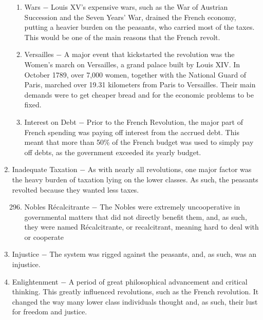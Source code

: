 \documentclass[12pt]{article}
\begin{document}
\begin{enumerate}
\begin{enumerate}[label=\arabic{*}.]
\item Wars $-$ Louis XV's expensive wars, such as the War of Austrian Succession and the Seven Years' War, drained the French economy, putting a heavier burden on the peasants, who carried most of the taxes. This would be one of the main reasons that the French revolt.

\item Versailles $-$ A major event that kickstarted the revolution was the Women's march on Versailles, a grand palace built by Louis XIV. In October 1789, over 7,000 women, together with the National Guard of Paris, marched over 19.31 kilometers from Paris to Versailles. Their main demands were to get cheaper bread and for the economic problems to be fixed.

\item Interest on Debt $-$ Prior to the French Revolution, the major part of French spending was paying off interest from the accrued debt. This meant that more than 50\% of the French budget was used to simply pay off debts, as the government exceeded its yearly budget.

\end{enumerate}
\setcounter{enumi}{294}

\item Inadequate Taxation $-$ As with nearly all revolutions, one major factor was the heavy burden of taxation lying on the lower classes. As such, the peasants revolted because they wanted less taxes.

\begin{enumerate}[label=\arabic{*}.]
\setcounter{enumii}{295}

\item Nobles R\'ecalcitrante $-$ The Nobles were extremely uncooperative in governmental matters that did not directly benefit them, and, as such, they were named R\'ecalcitrante, or recalcitrant, meaning hard to deal with or cooperate

\end{enumerate}
\setcounter{enumi}{296}

\item Injustice $-$ The system was rigged against the peasants, and, as such, was an injustice.

\item Enlightenment $-$ A period of great philosophical advancement and critical thinking. This greatly influenced revolutions, such as the French revolution. It changed the way many lower class individuals thought and, as such, their lust for freedom and justice.


\end{enumerate}
\end{document}
